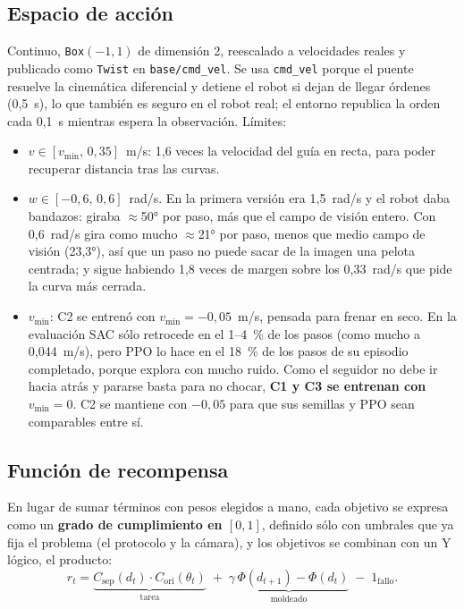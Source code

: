\documentclass[11pt,a4paper]{article}
\newcommand{\cod}[1]{\texttt{\small #1}}
\begin{document}
\subsection{Espacio de acción}\label{sec:accion}
Continuo, \cod{Box}$(-1,1)$ de dimensión 2, reescalado a velocidades reales y publicado como \cod{Twist} en
\cod{base/cmd\_vel}. Se usa \cod{cmd\_vel} porque el puente resuelve la cinemática diferencial y detiene el
robot si dejan de llegar órdenes (0,5~s), lo que también es seguro en el robot real; el entorno republica la
orden cada 0,1~s mientras espera la observación. Límites:
\begin{itemize}
\item $v\in[v_{\min},\,0{,}35]$~m/s: 1,6 veces la velocidad del guía en recta, para poder recuperar distancia
tras las curvas.
\item $w\in[-0{,}6,\,0{,}6]$~rad/s. En la primera versión era 1,5~rad/s y el robot daba bandazos: giraba
$\approx$50° por paso, más que el campo de visión entero. Con 0,6~rad/s gira como mucho $\approx$21° por paso,
menos que medio campo de visión (23,3°), así que un paso no puede sacar de la imagen una pelota centrada; y
sigue habiendo 1,8 veces de margen sobre los 0,33~rad/s que pide la curva más cerrada.
\item $v_{\min}$: C2 se entrenó con $v_{\min}=-0{,}05$~m/s, pensada para frenar en seco. En la evaluación SAC
sólo retrocede en el 1--4~\% de los pasos (como mucho a 0,044~m/s), pero PPO lo hace en el 18~\% de los pasos
de su episodio completado, porque explora con mucho ruido. Como el seguidor no debe ir hacia atrás y pararse
basta para no chocar, \textbf{C1 y C3 se entrenan con $v_{\min}=0$}. C2 se mantiene con $-0{,}05$ para que sus
semillas y PPO sean comparables entre sí.
\end{itemize}

\subsection{Función de recompensa}\label{sec:recompensa}
En lugar de sumar términos con pesos elegidos a mano, cada objetivo se expresa como un \textbf{grado de
cumplimiento en $[0,1]$}, definido sólo con umbrales que ya fija el problema (el protocolo y la cámara), y los
objetivos se combinan con un Y lógico, el producto:
\begin{equation}
r_t = \underbrace{C_{\text{sep}}(d_t)\cdot C_{\text{ori}}(\theta_t)}_{\text{tarea}}
\;+\;\underbrace{\gamma\,\Phi(d_{t+1})-\Phi(d_t)}_{\text{moldeado}}
\;-\;1_{\text{fallo}} .
\end{equation}
\end{document}

